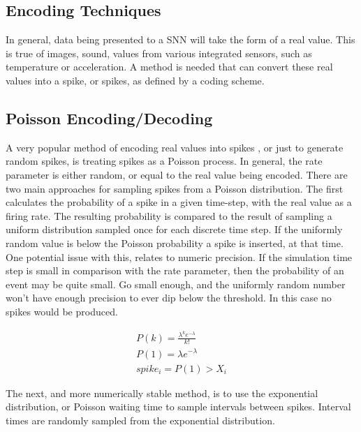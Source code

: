     \subsection{Encoding Techniques}
    In general, data being presented to a SNN will take the form of a real
    value. This is true of images, sound, values from various integrated
    sensors, such as temperature or acceleration. A method is needed that can
    convert these real values into a spike, or spikes, as defined by a coding
    scheme.
    
    \subsection{Poisson Encoding/Decoding}
    A very popular method of encoding real values into spikes , or just to
    generate random spikes, is treating spikes as a Poisson process. In general,
    the rate parameter is either random, or equal to the real value being
    encoded. There are two main approaches for sampling spikes from a Poisson
    distribution. The first calculates the probability of a spike in a given
    time-step, with the real value as a firing rate. The resulting probability
    is compared to the result of sampling a uniform distribution sampled once
    for each discrete time step. If the uniformly random value is below the
    Poisson probability a spike is inserted, at that time. One potential issue
    with this, relates to numeric precision. If the simulation time step is
    small in comparison with the rate parameter, then the probability of an
    event may be quite small. Go small enough, and the uniformly random number
    won't have enough precision to ever dip below the threshold. In this case no
    spikes would be produced.
    
    
    \begin{align}
        P(k) = \frac{\lambda^k e^{-\lambda}}{k!} \\ P(1) = \lambda e^{-\lambda}
        \\ spike_i = P(1) > X_i
    \end{align}
    
    The next, and more numerically stable method, is to use the exponential
    distribution, or Poisson waiting time to sample intervals between
    spikes. Interval times are randomly sampled from the exponential
    distribution.
    
